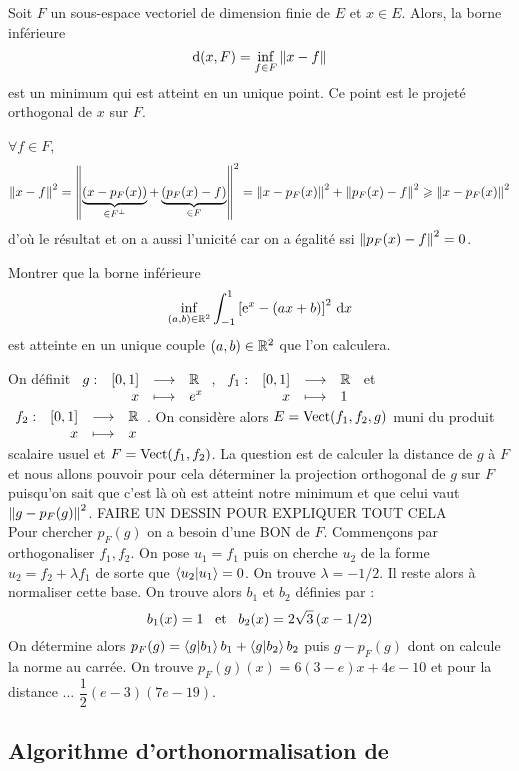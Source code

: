 \documentclass{magnolia}
\begin{document}
\begin{proposition}[utile=3]
Soit $F$ un sous-espace vectoriel de dimension finie de $E$ et $x\in E$. Alors, la borne
inférieure
\[{\rm d}(x,F)=\inf_{f\in F} \left\|x-f\right\|\]
est un minimum qui est atteint en un unique point. Ce point est le projeté orthogonal de $x$ sur $F$.  
\end{proposition}

\begin{preuve}
$\forall f \in F$, $$\left\|x-f\right\|^2=\left\|\underbrace{(x-p_F(x))}_{\in F^\perp}+\underbrace{\left(p_F(x)-f\right)}_{\in F}\right\|^2=\left\|x-p_F(x)\right\|^2+\left\|p_F(x)-f\right\|^2\geqslant \left\|x-p_F(x)\right\|^2$$ d'où le résultat et on a aussi l'unicité car on a égalité ssi $\left\|p_F(x)-f\right\|^2=0$.
\end{preuve}

\begin{exoUnique}
\exo Montrer que la borne inférieure
  \[\inf_{(a,b)\in\mathbb{R}^2} \int_{-1}^{1} \left[{\rm e}^x-\left(ax+b\right)\right]^2\,\text{d}x\]
  est atteinte en un unique couple $(a,b)\in\mathbb{R}^2$ que l'on calculera.
  \begin{sol}
  On définit $\begin{array}[t]{lrcl} \displaystyle{g} : & \displaystyle{\left[0,1\right]} & \longrightarrow & \displaystyle{\mathbb{R}} \\ & \displaystyle{x} & \longmapsto & \displaystyle{e^x} \end{array}$, $\begin{array}[t]{lrcl} \displaystyle{f_1} : & \displaystyle{\left[0,1\right]} & \longrightarrow & \displaystyle{\mathbb{R}} \\ & \displaystyle{x} & \longmapsto & \displaystyle{1} \end{array}$ et $\begin{array}[t]{lrcl} \displaystyle{f_2} : & \displaystyle{\left[0,1\right]} & \longrightarrow & \displaystyle{\mathbb{R}} \\ & \displaystyle{x} & \longmapsto & \displaystyle{x} \end{array}$. On considère alors $E=\operatorname{Vect}(f_1,f_2,g)$ muni du produit scalaire usuel et $F=\operatorname{Vect}(f_1,f_2)$. La question est de calculer la distance de $g$ à $F$ et nous allons pouvoir pour cela déterminer la projection orthogonal de $g$ sur $F$ puisqu'on sait que c'est là où est atteint notre minimum et que celui vaut $\left\|g-p_F(g)\right\|^2$. FAIRE UN DESSIN POUR EXPLIQUER TOUT CELA\\
  Pour chercher $p_F(g)$ on a besoin d'une BON de $F$. Commençons par orthogonaliser $f_1,f_2$. On pose $u_1=f_1$ puis on cherche $u_2$ de la forme $u_2=f_2+\lambda f_1$ de sorte que $\left\langle {u_2}\middle|{u_1}\right\rangle=0$. On trouve $\lambda=-1/2$. Il reste alors à normaliser cette base. On trouve alors $b_1$ et $b_2$ définies par :
  \[b_1(x)=1 \quad\!\text{et}\quad\! b_2(x)=2\sqrt{3}\left(x-1/2\right)\]
  On détermine alors $p_F(g)=\left\langle {g}\middle|{b_1}\right\rangle b_1+\left\langle {g}\middle|{b_2}\right\rangle b_2$ puis $g-p_F(g)$ dont on calcule la norme au carrée. On trouve $p_F(g)(x)=6(3-e)x+4e-10$ et pour la distance ... $\dfrac{1}{2}(e-3)(7e-19)$.
  \end{sol}  
\end{exoUnique}

\subsection{Algorithme d'orthonormalisation de }
\end{document}
